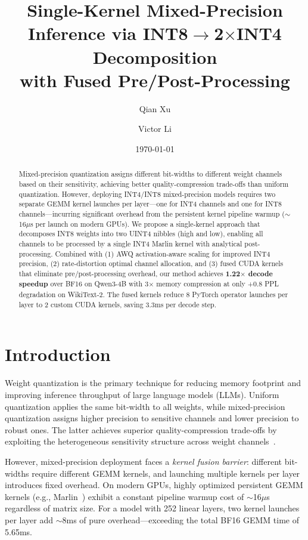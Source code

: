 \documentclass[11pt,a4paper]{article}
\title{Single-Kernel Mixed-Precision Inference via INT8$\to$2$\times$INT4 Decomposition\\with Fused Pre/Post-Processing}
\author{Qian Xu \and Victor Li}
\date{\today}
\begin{document}
\maketitle

\begin{abstract}
Mixed-precision quantization assigns different bit-widths to different weight channels based on their sensitivity, achieving better quality-compression trade-offs than uniform quantization. However, deploying INT4/INT8 mixed-precision models requires two separate GEMM kernel launches per layer---one for INT4 channels and one for INT8 channels---incurring significant overhead from the persistent kernel pipeline warmup ($\sim$16$\mu$s per launch on modern GPUs). We propose a single-kernel approach that decomposes INT8 weights into two UINT4 nibbles (high and low), enabling all channels to be processed by a single INT4 Marlin kernel with analytical post-processing. Combined with (1) AWQ activation-aware scaling for improved INT4 precision, (2) rate-distortion optimal channel allocation, and (3) fused CUDA kernels that eliminate pre/post-processing overhead, our method achieves \textbf{1.22$\times$ decode speedup} over BF16 on Qwen3-4B with 3$\times$ memory compression at only +0.8 PPL degradation on WikiText-2. The fused kernels reduce 8 PyTorch operator launches per layer to 2 custom CUDA kernels, saving 3.3ms per decode step.
\end{abstract}

\section{Introduction}
\label{sec:intro}

Weight quantization is the primary technique for reducing memory footprint and improving inference throughput of large language models (LLMs). Uniform quantization applies the same bit-width to all weights, while mixed-precision quantization assigns higher precision to sensitive channels and lower precision to robust ones. The latter achieves superior quality-compression trade-offs by exploiting the heterogeneous sensitivity structure across weight channels~\cite{lin2024awq,frantar2023gptq}.

However, mixed-precision deployment faces a \emph{kernel fusion barrier}: different bit-widths require different GEMM kernels, and launching multiple kernels per layer introduces fixed overhead. On modern GPUs, highly optimized persistent GEMM kernels (e.g., Marlin~\cite{frantar2024marlin}) exhibit a constant pipeline warmup cost of $\sim$16$\mu$s regardless of matrix size. For a model with 252 linear layers, two kernel launches per layer add $\sim$8ms of pure overhead---exceeding the total BF16 GEMM time of 5.65ms.
\end{document}
